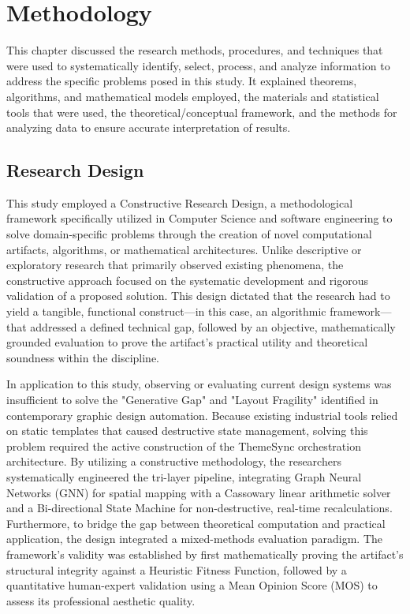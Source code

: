 
\chapter{Methodology}
\begin{refsection}
This chapter discussed the research methods, procedures, and techniques that were used to systematically identify, select, process, and analyze information to address the specific problems posed in this study. It explained theorems, algorithms, and mathematical models employed, the materials and statistical tools that were used, the theoretical/conceptual framework, and the methods for analyzing data to ensure accurate interpretation of results.


\section{Research Design}
This study employed a Constructive Research Design, a methodological framework specifically utilized in Computer Science and software engineering to solve domain-specific problems through the creation of novel computational artifacts, algorithms, or mathematical architectures. Unlike descriptive or exploratory research that primarily observed existing phenomena, the constructive approach focused on the systematic development and rigorous validation of a proposed solution. This design dictated that the research had to yield a tangible, functional construct—in this case, an algorithmic framework—that addressed a defined technical gap, followed by an objective, mathematically grounded evaluation to prove the artifact's practical utility and theoretical soundness within the discipline.

In application to this study, observing or evaluating current design systems was insufficient to solve the "Generative Gap" and "Layout Fragility" identified in contemporary graphic design automation. Because existing industrial tools relied on static templates that caused destructive state management, solving this problem required the active construction of the ThemeSync orchestration architecture. By utilizing a constructive methodology, the researchers systematically engineered the tri-layer pipeline, integrating Graph Neural Networks (GNN) for spatial mapping with a Cassowary linear arithmetic solver and a Bi-directional State Machine for non-destructive, real-time recalculations. Furthermore, to bridge the gap between theoretical computation and practical application, the design integrated a mixed-methods evaluation paradigm. The framework's validity was established by first mathematically proving the artifact's structural integrity against a Heuristic Fitness Function, followed by a quantitative human-expert validation using a Mean Opinion Score (MOS) to assess its professional aesthetic quality.


\end{refsection}
